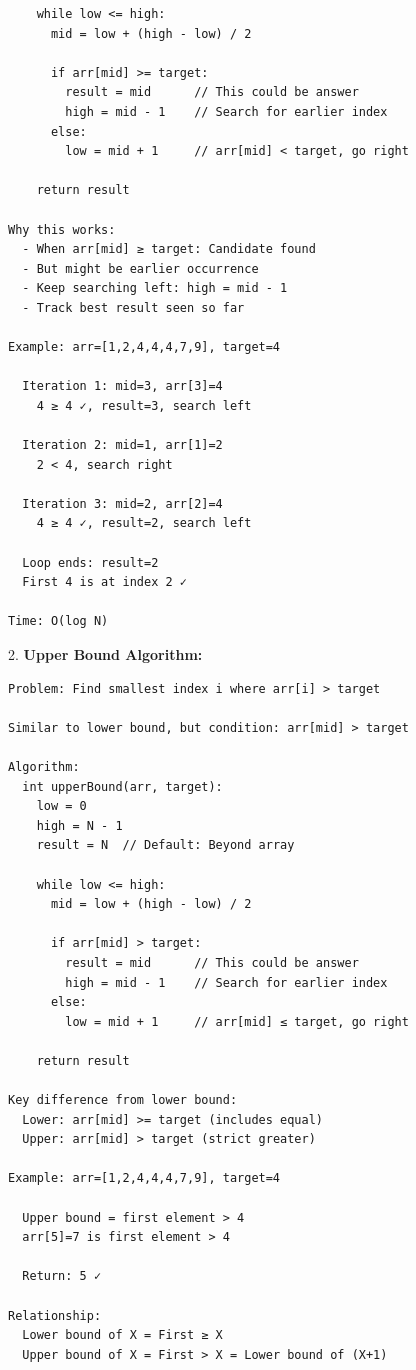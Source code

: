 \documentclass[11pt,a4paper,oneside]{book}
\begin{document}
\begin{tcolorbox}[
    enhanced,breakable,
    colback=white,
    colframe=deepblue,
    boxrule=1.5pt,
    arc=3mm,
    title=\textbf{The Boundary Search Paradigm}
]
\begin{verbatim}
    while low <= high:
      mid = low + (high - low) / 2
      
      if arr[mid] >= target:
        result = mid      // This could be answer
        high = mid - 1    // Search for earlier index
      else:
        low = mid + 1     // arr[mid] < target, go right

    return result

Why this works:
  - When arr[mid] ≥ target: Candidate found
  - But might be earlier occurrence
  - Keep searching left: high = mid - 1
  - Track best result seen so far

Example: arr=[1,2,4,4,4,7,9], target=4
  
  Iteration 1: mid=3, arr[3]=4
    4 ≥ 4 ✓, result=3, search left
    
  Iteration 2: mid=1, arr[1]=2
    2 < 4, search right
    
  Iteration 3: mid=2, arr[2]=4
    4 ≥ 4 ✓, result=2, search left
  
  Loop ends: result=2
  First 4 is at index 2 ✓

Time: O(log N)
\end{verbatim}

2. \textbf{Upper Bound Algorithm:}
\begin{verbatim}
Problem: Find smallest index i where arr[i] > target

Similar to lower bound, but condition: arr[mid] > target

Algorithm:
  int upperBound(arr, target):
    low = 0
    high = N - 1
    result = N  // Default: Beyond array
    
    while low <= high:
      mid = low + (high - low) / 2
      
      if arr[mid] > target:
        result = mid      // This could be answer
        high = mid - 1    // Search for earlier index
      else:
        low = mid + 1     // arr[mid] ≤ target, go right
    
    return result

Key difference from lower bound:
  Lower: arr[mid] >= target (includes equal)
  Upper: arr[mid] > target (strict greater)

Example: arr=[1,2,4,4,4,7,9], target=4

  Upper bound = first element > 4
  arr[5]=7 is first element > 4
  
  Return: 5 ✓

Relationship:
  Lower bound of X = First ≥ X
  Upper bound of X = First > X = Lower bound of (X+1)
\end{verbatim}


\end{tcolorbox}
\end{document}
